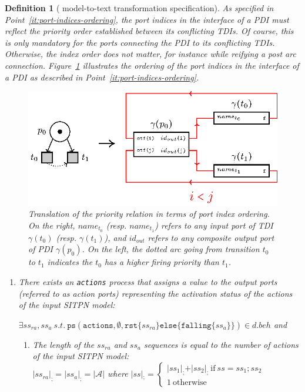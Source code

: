 \documentclass[pdflatex,sn-mathphys]{sn-jnl}%
\theoremstyle{thmstyleone}%
\theoremstyle{thmstyletwo}%
\theoremstyle{thmstylethree}%
\newtheorem{definition}{Definition}%
\begin{document}
\begin{definition}[\hilecop{} model-to-text transformation specification]
  As specified in Point~\ref{it:port-indices-ordering}, the port
  indices in the interface of a PDI must reflect the priority order
  established between its \textit{conflicting} TDIs. Of course, this
  is only mandatory for the ports connecting the PDI to its
  conflicting TDIs. Otherwise, the index order does not matter, for
  instance while reifying a post arc connection.
  Figure~\ref{fig:gen-prio-order} illustrates the ordering of the port
  indices in the interface of a PDI as described in
  Point~\ref{it:port-indices-ordering}.

  \begin{figure}[h]
    \centering
    \includegraphics[keepaspectratio,width=.8\textwidth]{gen-prio-order.eps}
    \caption{Translation of the priority relation in terms of port
      index ordering. On the right, $name_{t_0}$ (resp. $name_{t_1}$)
      refers to any input port of TDI $\gamma(t_0)$
      (resp. $\gamma(t_1)$), and $id_{out}$ refers to any composite
      output port of PDI $\gamma(p_0)$. On the left, the dotted arc
      going from transition $t_0$ to $t_1$ indicates the $t_0$ has a
      higher firing priority than $t_1$. }
    \label{fig:gen-prio-order}
  \end{figure}

  \begin{enumerate}[resume]
  \item\label{it:actions} There exists an \texttt{actions} process
    that assigns a value to the output ports (referred to as
    \textit{action} ports) representing the activation status of the
    actions of the input SITPN model:
    
    $\exists{}ss_{ra},ss_{a}~s.t.~\mathtt{ps}(\mathtt{actions},\emptyset,\mathtt{rst}\{ss_{ra}\}\mathtt{else}\{\mathtt{falling}\{ss_a\}\})\in{}d.beh$
    and
    \begin{enumerate}
    \item The length of the $ss_{ra}$ and $ss_{a}$ sequences is equal
      to the number of actions of the input SITPN model:\\
      $\vert{}ss_{ra}\vert_{;}=\vert{}ss_a\vert_{;}=\vert\mathcal{A}\vert$
      where $\vert{}ss\vert{}_{;}=
      \begin{cases}
        \vert{}ss_1\vert_{;}+\vert{}ss_2\vert_{;}~\mathrm{if}~ss=ss_1;ss_2 \\
        1~\mathrm{otherwise}
      \end{cases}
      $
      

\end{enumerate}
\end{enumerate}
\end{definition}
\end{document}
